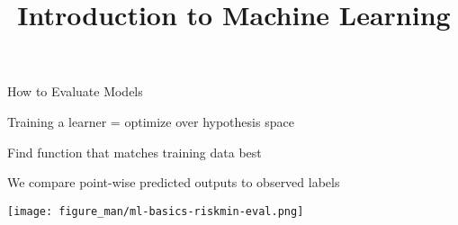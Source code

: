 \documentclass[11pt,compress,t,notes=noshow, xcolor=table]{beamer}
\title{Introduction to Machine Learning}
\begin{document}


\begin{vbframe}{How to Evaluate Models}
  
  \begin{itemizeM}
    \item Training a learner = optimize over hypothesis space
    \item Find function that matches training data best
    \item We compare point-wise predicted outputs to 
    observed labels
  \end{itemizeM}
  
  \vfill
  
  
  
  
  \begin{center}\texttt{[image: figure\_man/ml-basics-riskmin-eval.png]} \end{center}
  
  
\end{vbframe}

\end{document}
